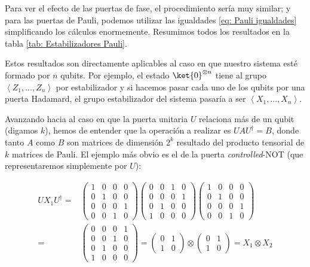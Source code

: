 \documentclass[11pt,a4paper,twoside,pdf]{article}
\numberwithin{equation}{section}
\begin{document}
		Para ver el efecto de las puertas de fase, el procedimiento sería muy similar; y para las puertas de Pauli, podemos utilizar las igualdades \ref{eq: Pauli igualdades} simplificando los cálculos enormemente. Resumimos todos los resultados en la tabla \ref{tab: Estabilizadores Pauli}.
		
		Estos resultados son directamente aplicables al caso en que nuestro sistema esté formado por $n$ qubits. Por ejemplo, el estado $\ket{0}^{\otimes n}$ tiene al grupo $\left\langle Z_1,...,Z_n\right\rangle $ por estabilizador y si hacemos pasar cada uno de los qubits por una puerta Hadamard, el grupo estabilizador del sistema pasaría a ser $\left\langle X_1,...,X_n\right\rangle$.
		
		Avanzando hacia al caso en que la puerta unitaria $U$ relaciona más de un qubit (digamos $k$), hemos de entender que la operación a realizar es $UAU^{\dagger}=B$, donde tanto $A$ como $B$ son matrices de dimensión $2^k$ resultado del producto tensorial de $k$ matrices de Pauli. El ejemplo más obvio es el de la puerta \textit{controlled}-NOT (que representaremos simplemente por $U$):
		
			\begin{equation}\label{eq: CNOT estabilizador}
				\begin{aligned}
				UX_1U^{\dagger} =& 
					\left(\begin{array}{cccc}
						1 & 0 & 0 & 0\\
						0 & 1 & 0 & 0\\
						0 & 0 & 0 & 1\\
						0 & 0 & 1 & 0
					\end{array}\right)	
					\left(\begin{array}{cccc}
						0 & 0 & 1 & 0\\
						0 & 0 & 0 & 1\\
						0 & 1 & 0 & 0\\
						1 & 0 & 0 & 0
					\end{array}\right)	
					\left(\begin{array}{cccc}
						1 & 0 & 0 & 0\\
						0 & 1 & 0 & 0\\
						0 & 0 & 0 & 1\\
						0 & 0 & 1 & 0
					\end{array}\right)	\\ =& 
					\left(\begin{array}{cccc}
						0 & 0 & 0 & 1\\
						0 & 0 & 1 & 0\\
						0 & 1 & 0 & 0\\
						1 & 0 & 0 & 0
					\end{array}\right)	=
					\left(\begin{array}{cc}
						0 & 1 \\
						1 & 0 
					\end{array} \right)	\otimes
					\left(\begin{array}{cc}
						0 & 1 \\
						1 & 0 
					\end{array} \right)	= X_1 \otimes X_2
				\end{aligned}	
			\end{equation}
		
\end{document}
